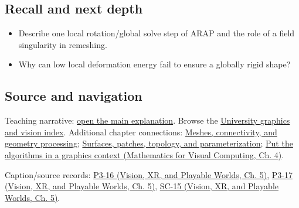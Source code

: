 \subsection{Recall and next depth}\label{appendix-7107009c505b-recall-and-next-depth}

\begin{itemize}
\tightlist
\item
  Describe one local rotation/global solve step of ARAP and the role of a field singularity in remeshing.
\item
  Why can low local deformation energy fail to ensure a globally rigid shape?
\end{itemize}

\subsection{Source and navigation}\label{appendix-7107009c505b-source-and-navigation}

Teaching narrative: \hyperref[03-visual-computing-i-ch002-meshes-connectivity-and-geometry-processing]{open the main explanation}. Browse the \hyperref[appendix-a6d556a4ef50-university-graphics-vision-and-photography---independent-series]{University graphics and vision index}. Additional chapter connections: \hyperref[03-visual-computing-i-ch002-meshes-connectivity-and-geometry-processing]{Meshes, connectivity, and geometry processing}; \hyperref[03-visual-computing-i-ch002-surfaces-patches-topology-and-parameterization]{Surfaces, patches, topology, and parameterization}; \href{../02-Mathematics-for-Visual-Computing/main.pdf\#nameddest=01-foundations-i-ch020-put-the-algorithms-in-a-graphics-context}{Put the algorithms in a graphics context (Mathematics for Visual Computing, Ch. 4)}.

Caption/source records: \href{../07-Vision-XR-and-Playable-Worlds/main.pdf\#nameddest=04-visual-computing-ii-ch036-p3-16---subdivision-surfaces-part-1}{P3-16 (Vision, XR, and Playable Worlds, Ch. 5)}, \href{../07-Vision-XR-and-Playable-Worlds/main.pdf\#nameddest=04-visual-computing-ii-ch036-p3-17---subdivision-surfaces-part-2}{P3-17 (Vision, XR, and Playable Worlds, Ch. 5)}, \href{../07-Vision-XR-and-Playable-Worlds/main.pdf\#nameddest=04-visual-computing-ii-ch036-sc-15---stanford-cs231n-deep-learning-for-computer-vision-spring-2025-lecture-15-3d-vision}{SC-15 (Vision, XR, and Playable Worlds, Ch. 5)}.
